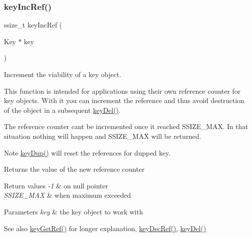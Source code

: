 \subsubsection{\texorpdfstring{key\+Inc\+Ref()}{keyIncRef()}}
{\footnotesize\ttfamily ssize\+\_\+t key\+Inc\+Ref (\begin{DoxyParamCaption}\item[{Key $\ast$}]{key }\end{DoxyParamCaption})}



Increment the viability of a key object. 

This function is intended for applications using their own reference counter for key objects. With it you can increment the reference and thus avoid destruction of the object in a subsequent \hyperlink{group__key_ga3df95bbc2494e3e6703ece5639be5bb1}{key\+Del()}.

The reference counter can\textquotesingle{}t be incremented once it reached S\+S\+I\+Z\+E\+\_\+\+M\+AX. In that situation nothing will happen and S\+S\+I\+Z\+E\+\_\+\+M\+AX will be returned.

\begin{DoxyNote}{Note}
\hyperlink{group__key_gae6ec6a60cc4b8c1463fa08623d056ce3}{key\+Dup()} will reset the references for dupped key.
\end{DoxyNote}
\begin{DoxyReturn}{Returns}
the value of the new reference counter 
\end{DoxyReturn}

\begin{DoxyRetVals}{Return values}
{\em -\/1} & on null pointer \\
\hline
{\em S\+S\+I\+Z\+E\+\_\+\+M\+AX} & when maximum exceeded \\
\hline
\end{DoxyRetVals}

\begin{DoxyParams}{Parameters}
{\em key} & the key object to work with \\
\hline
\end{DoxyParams}
\begin{DoxySeeAlso}{See also}
\hyperlink{group__key_ga4aabc4272506dd63161db2bbb42de8ae}{key\+Get\+Ref()} for longer explanation, \hyperlink{group__key_ga2c6433ca22109e4e141946057eccb283}{key\+Dec\+Ref()}, \hyperlink{group__key_ga3df95bbc2494e3e6703ece5639be5bb1}{key\+Del()} 
\end{DoxySeeAlso}
\mbox{\label{group__key_gad23c65b44bf48d773759e1f9a4d43b89}} 

